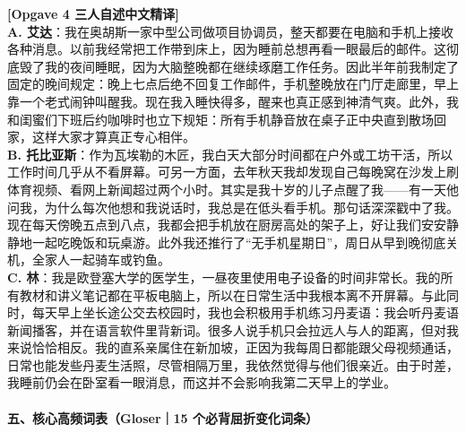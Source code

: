 \begin{transbox}
\small
\textbf{\color{NCDTeal}[Opgave 4 三人自述中文精译]}\\
\textbf{A. 艾达}：我在奥胡斯一家中型公司做项目协调员，整天都要在电脑和手机上接收各种消息。以前我经常把工作带到床上，因为睡前总想再看一眼最后的邮件。这彻底毁了我的夜间睡眠，因为大脑整晚都在继续琢磨工作任务。因此半年前我制定了固定的晚间规定：晚上七点后绝不回复工作邮件，手机整晚放在门厅走廊里，早上靠一个老式闹钟叫醒我。现在我入睡快得多，醒来也真正感到神清气爽。此外，我和闺蜜们下班后约咖啡时也立下规矩：所有手机静音放在桌子正中央直到散场回家，这样大家才算真正专心相伴。\\
\textbf{B. 托比亚斯}：作为瓦埃勒的木匠，我白天大部分时间都在户外或工坊干活，所以工作时间几乎从不看屏幕。可另一方面，去年秋天我却发现自己每晚窝在沙发上刷体育视频、看网上新闻超过两个小时。其实是我十岁的儿子点醒了我——有一天他问我，为什么每次他想和我说话时，我总是在低头看手机。那句话深深戳中了我。现在每天傍晚五点到八点，我都会把手机放在厨房高处的架子上，好让我们安安静静地一起吃晚饭和玩桌游。此外我还推行了“无手机星期日”，周日从早到晚彻底关机，全家人一起骑车或钓鱼。\\
\textbf{C. 林}：我是欧登塞大学的医学生，一昼夜里使用电子设备的时间非常长。我的所有教材和讲义笔记都在平板电脑上，所以在日常生活中我根本离不开屏幕。与此同时，每天早上坐长途公交去校园时，我也会积极用手机练习丹麦语：我会听丹麦语新闻播客，并在语言软件里背新词。很多人说手机只会拉远人与人的距离，但对我来说恰恰相反。我的直系亲属住在新加坡，正因为我每周日都能跟父母视频通话，日常也能发些丹麦生活照，尽管相隔万里，我依然觉得与他们很亲近。由于时差，我睡前仍会在卧室看一眼消息，而这并不会影响我第二天早上的学业。
\end{transbox}

\paragraph*{五、核心高频词表（Gloser｜15 个必背屈折变化词条）}

